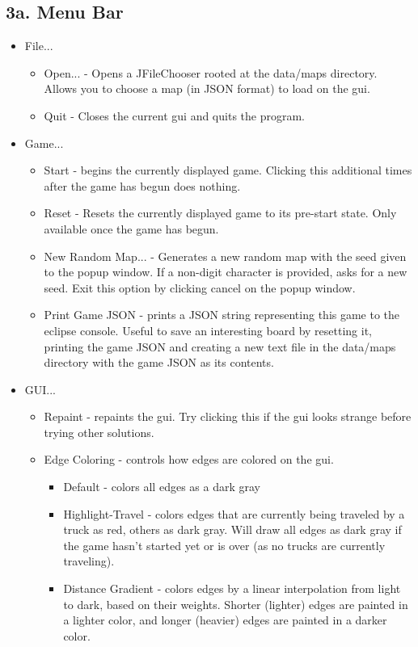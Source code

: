 \documentclass[11pt]{article}
\begin{document}
\subsection{3a. Menu Bar}
\begin{itemize}
\item File...
\begin{itemize}
\item Open... - Opens a JFileChooser rooted at the data/maps directory. Allows you to choose a map (in JSON format) to load on the gui.
\item Quit - Closes the current gui and quits the program.
\end{itemize}
\item Game...
\begin{itemize}
\item Start - begins the currently displayed game. Clicking this additional times after the game has begun does nothing.
\item Reset - Resets the currently displayed game to its pre-start state. Only available once the game has begun.
\item New Random Map... - Generates a new random map with the seed given to the popup window. If a non-digit character is provided, asks for a new seed. Exit this option by clicking cancel on the popup window.
\item Print Game JSON - prints a JSON string representing this game to the eclipse console. Useful to save an interesting board by resetting it, printing the game JSON and creating a new text file in the data/maps directory with the game JSON as its contents.
\end{itemize}
\item GUI...
\begin{itemize}
\item Repaint - repaints the gui. Try clicking this if the gui looks strange before trying other solutions.
\item Edge Coloring - controls how edges are colored on the gui.
\begin{itemize}
\item Default - colors all edges as a dark gray
\item Highlight-Travel - colors edges that are currently being traveled by a truck as red, others as dark gray. Will draw all edges as dark gray if the game hasn't started yet or is over (as no trucks are currently traveling).
\item Distance Gradient - colors edges by a linear interpolation from light to dark, based on their weights. Shorter (lighter) edges are painted in a lighter color, and longer (heavier) edges are painted in a  darker color.
\end{itemize}
\end{itemize}
\end{itemize}
\end{document}

